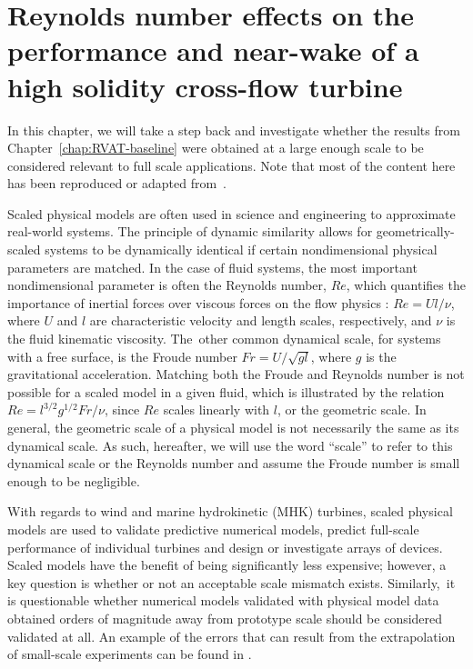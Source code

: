 \chapter{Reynolds number effects on the performance and near-wake of a high
solidity cross-flow turbine} \label{chap:Re-dep}

In this chapter, we will take a step back and investigate whether the results
from Chapter~\ref{chap:RVAT-baseline} were obtained at a large enough scale to
be considered relevant to full scale applications. Note that most of the content
here has been reproduced or adapted from~\cite{Bachant2016-Energies}.

Scaled physical models are often used in science and engineering to approximate
real-world systems. The principle of dynamic similarity allows for
geometrically-scaled systems to be dynamically identical if certain
nondimensional physical parameters are matched. In the case of fluid systems,
the most important nondimensional parameter is often the Reynolds number, $Re$,
which quantifies the importance of inertial forces over viscous forces on the
flow physics \cite{Acheson1990}: $Re = Ul/\nu$, where $U$ and $l$ are
characteristic velocity and length scales, respectively, and $\nu$ is the fluid
kinematic viscosity. The~other common dynamical scale, for systems with a free
surface, is the Froude number $Fr = U/\sqrt{gl}$, where $g$ is the gravitational
acceleration. Matching both the Froude and Reynolds number is not possible for a
scaled model in a given fluid, which is illustrated by the relation $Re =
l^{3/2} g^{1/2} Fr / \nu$, since $Re$ scales linearly with $l$, or the geometric
scale. In general, the geometric scale of a physical model is not necessarily
the same as its dynamical scale. As such, hereafter, we will use the word
``scale'' to refer to this dynamical scale or the Reynolds number and assume the
Froude number is small enough to be negligible.

With regards to wind and marine hydrokinetic (MHK) turbines, scaled physical
models are used to validate predictive numerical models, predict full-scale
performance of individual turbines and design or investigate arrays of devices.
Scaled models have the benefit of being significantly less expensive; however, a
key question is whether or not an acceptable scale mismatch exists.
Similarly,~it is questionable whether numerical models validated with physical
model data obtained orders of magnitude away from prototype scale should be
considered validated at all. An example of the errors that can result from the
extrapolation of small-scale experiments can be found in \cite{Baker1991}.

